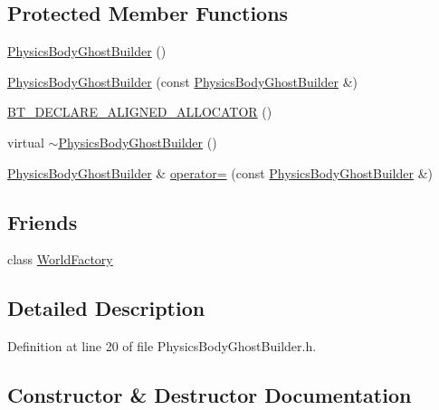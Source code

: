 \subsection*{Protected Member Functions}
\begin{DoxyCompactItemize}
\item 
\mbox{\hyperlink{classnjli_1_1_physics_body_ghost_builder_a15cf1ce6427ba30588ea31feab7dc61c}{Physics\+Body\+Ghost\+Builder}} ()
\item 
\mbox{\hyperlink{classnjli_1_1_physics_body_ghost_builder_ad16190ff46c4cf7cae5b92837e0f4c9a}{Physics\+Body\+Ghost\+Builder}} (const \mbox{\hyperlink{classnjli_1_1_physics_body_ghost_builder}{Physics\+Body\+Ghost\+Builder}} \&)
\item 
\mbox{\hyperlink{classnjli_1_1_physics_body_ghost_builder_a2ddac8155aa2c1329fd94501496d16ae}{B\+T\+\_\+\+D\+E\+C\+L\+A\+R\+E\+\_\+\+A\+L\+I\+G\+N\+E\+D\+\_\+\+A\+L\+L\+O\+C\+A\+T\+OR}} ()
\item 
virtual \mbox{\hyperlink{classnjli_1_1_physics_body_ghost_builder_abbfd3517213575dedfe287c2982a3202}{$\sim$\+Physics\+Body\+Ghost\+Builder}} ()
\item 
\mbox{\hyperlink{classnjli_1_1_physics_body_ghost_builder}{Physics\+Body\+Ghost\+Builder}} \& \mbox{\hyperlink{classnjli_1_1_physics_body_ghost_builder_a8f711c771c4b12e5c78a2da5dfae0b15}{operator=}} (const \mbox{\hyperlink{classnjli_1_1_physics_body_ghost_builder}{Physics\+Body\+Ghost\+Builder}} \&)
\end{DoxyCompactItemize}
\subsection*{Friends}
\begin{DoxyCompactItemize}
\item 
class \mbox{\hyperlink{classnjli_1_1_physics_body_ghost_builder_acb96ebb09abe8f2a37a915a842babfac}{World\+Factory}}
\end{DoxyCompactItemize}


\subsection{Detailed Description}


Definition at line 20 of file Physics\+Body\+Ghost\+Builder.\+h.



\subsection{Constructor \& Destructor Documentation}
\mbox{\label{classnjli_1_1_physics_body_ghost_builder_a15cf1ce6427ba30588ea31feab7dc61c}} 
